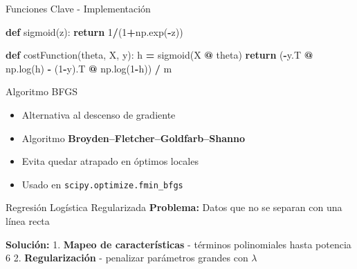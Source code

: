 \documentclass[
  ignorenonframetext,
]{beamer}
\newenvironment{Shaded}{\begin{snugshade}}{\end{snugshade}}
\newcommand{\ControlFlowTok}[1]{\textcolor[rgb]{0.13,0.29,0.53}{\textbf{#1}}}
\newcommand{\DecValTok}[1]{\textcolor[rgb]{0.00,0.00,0.81}{#1}}
\newcommand{\KeywordTok}[1]{\textcolor[rgb]{0.13,0.29,0.53}{\textbf{#1}}}
\newcommand{\NormalTok}[1]{#1}
\newcommand{\OperatorTok}[1]{\textcolor[rgb]{0.81,0.36,0.00}{\textbf{#1}}}
\providecommand{\tightlist}{%
  \setlength{\itemsep}{0pt}\setlength{\parskip}{0pt}}
\begin{document}
\begin{frame}[fragile]
\begin{block}{Funciones Clave - Implementación}
\label{funciones-clave---implementaciuxf3n}
\begin{Shaded}
\begin{Highlighting}[]
\KeywordTok{def}\NormalTok{ sigmoid(z):}
    \ControlFlowTok{return} \DecValTok{1}\OperatorTok{/}\NormalTok{(}\DecValTok{1}\OperatorTok{+}\NormalTok{np.exp(}\OperatorTok{{-}}\NormalTok{z))}

\KeywordTok{def}\NormalTok{ costFunction(theta, X, y):}
\NormalTok{    h }\OperatorTok{=}\NormalTok{ sigmoid(X }\OperatorTok{@}\NormalTok{ theta)}
    \ControlFlowTok{return}\NormalTok{ (}\OperatorTok{{-}}\NormalTok{y.T }\OperatorTok{@}\NormalTok{ np.log(h) }\OperatorTok{{-}}\NormalTok{ (}\DecValTok{1}\OperatorTok{{-}}\NormalTok{y).T }\OperatorTok{@}\NormalTok{ np.log(}\DecValTok{1}\OperatorTok{{-}}\NormalTok{h)) }\OperatorTok{/}\NormalTok{ m}
\end{Highlighting}
\end{Shaded}
\end{block}
\end{frame}

\begin{frame}[fragile]
\begin{block}{Algoritmo BFGS}
\label{algoritmo-bfgs}
\begin{itemize}
\tightlist
\item
  Alternativa al descenso de gradiente
\item
  Algoritmo \textbf{Broyden--Fletcher--Goldfarb--Shanno}
\item
  Evita quedar atrapado en óptimos locales
\item
  Usado en \texttt{scipy.optimize.fmin\_bfgs}
\end{itemize}
\end{block}
\end{frame}

\begin{frame}
\begin{block}{Regresión Logística Regularizada}
\label{regresiuxf3n-loguxedstica-regularizada}
\textbf{Problema:} Datos que no se separan con una línea recta

\textbf{Solución:} 1. \textbf{Mapeo de características} - términos
polinomiales hasta potencia 6 2. \textbf{Regularización} - penalizar
parámetros grandes con \(\lambda\)
\end{block}
\end{frame}
\end{document}
